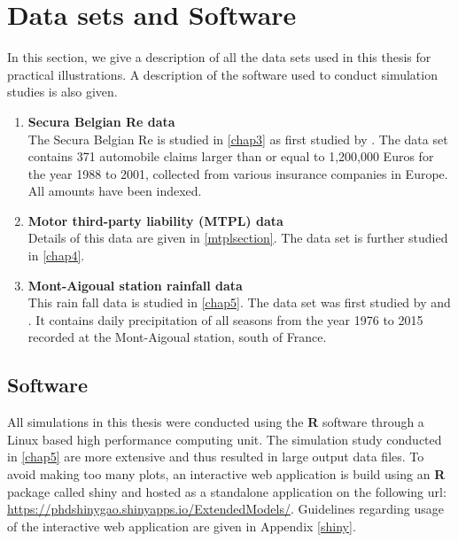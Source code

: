 \section{Data sets and Software}
In this section, we give a description of all the data sets used in this thesis for practical illustrations. A description of the software used to conduct simulation studies is also given.

\begin{enumerate}
\item \textbf{Secura Belgian Re data}\\
The Secura Belgian Re is studied in \autoref{chap3} as first studied by \cite{sts626}. The data set contains 371 automobile claims larger than or equal to 1,200,000 Euros for the year 1988 to 2001, collected from various insurance companies in Europe. All amounts have been indexed.
\item \textbf{Motor third-party liability (MTPL) data}\\
Details of this data are given in \autoref{mtplsection}. The data set is further studied in \autoref{chap4}.
\item \textbf{Mont-Aigoual station rainfall data}\\
This rain fall data is studied in \autoref{chap5}. The data set was first studied by \cite{carreau2017partitioning} and \cite{tencaliec2018flexible}. It contains daily precipitation of all seasons from the year 1976 to 2015 recorded at the Mont-Aigoual station, south of France.
\end{enumerate}

\subsection*{Software}
All simulations in this thesis were conducted using the \textbf{R} \citep{R} software through a Linux based high performance computing unit. The simulation study conducted in \autoref{chap5} are more extensive and thus resulted in large output data files. To avoid making too many plots, an interactive web application is build using an \textbf{R} package called shiny \citep{shiny} and hosted as a standalone application on the following url: \url{https://phdshinygao.shinyapps.io/ExtendedModels/}. Guidelines regarding usage of the interactive web application are given in Appendix \ref{shiny}.

